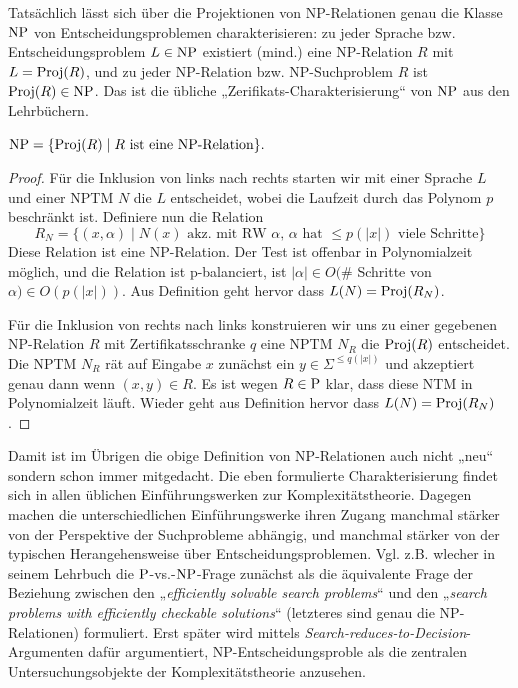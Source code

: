 Tatsächlich lässt sich über die Projektionen von NP-Relationen genau die Klasse $\NP$ von Entscheidungsproblemen charakterisieren: zu jeder Sprache bzw. Entscheidungsproblem $L\in \NP$ existiert (mind.) eine NP-Relation $R$ mit $L=\Proj(R)$, und zu jeder NP-Relation bzw. NP-Suchproblem $R$ ist $\Proj(R)\in\NP$. Das ist die übliche „Zerifikats-Charakterisierung“ von $\NP$ aus den Lehrbüchern.
\begin{observation}\label{obs:np-certificate-def}
    $\NP = \{ \Proj(R) \mid \text{$R$ ist eine NP-Relation} \}.$
\end{observation}
\begin{proof}
    Für die Inklusion von links nach rechts starten wir mit einer Sprache $L$ und einer NPTM $N$ die $L$ entscheidet, wobei die Laufzeit durch das Polynom $p$ beschränkt ist. Definiere nun die Relation
    \[ R_N = \{ (x, \alpha) \mid \text{$N(x)$ akz. mit RW $\alpha$, $\alpha$ hat $\leq p(|x|)$ viele Schritte} \} \]
    Diese Relation ist eine NP-Relation. Der Test ist offenbar in Polynomialzeit möglich, und die Relation ist p-balanciert, ist $|\alpha|\in O($\# Schritte von $\alpha)\in O(p(|x|))$.
    Aus Definition geht hervor dass $L(N) = \Proj(R_N)$.

    Für die Inklusion von rechts nach links konstruieren wir uns zu einer gegebenen NP-Relation $R$ mit Zertifikatsschranke $q$ eine NPTM $N_R$ die $\Proj(R)$ entscheidet. Die NPTM $N_R$ rät auf Eingabe $x$ zunächst ein $y\in\Sigma^{\leq q(|x|)}$ und akzeptiert genau dann wenn $(x,y)\in R$.
    Es ist wegen $R\in \P$ klar, dass diese NTM in Polynomialzeit läuft.
    Wieder geht aus Definition hervor dass $L(N) = \Proj(R_N)$.
\end{proof}
Damit ist im Übrigen die obige Definition von NP-Relationen auch nicht „neu“ sondern schon immer mitgedacht. Die eben formulierte Charakterisierung findet sich in allen üblichen Einführungswerken zur Komplexitätstheorie. Dagegen machen die unterschiedlichen Einführungswerke ihren Zugang manchmal stärker von der Perspektive der Suchprobleme abhängig, und manchmal stärker von der typischen Herangehensweise über Entscheidungsproblemen.
Vgl. z.B. \textcite{goldreich_computational_2008} wlecher in seinem Lehrbuch die $\P$-vs.-$\NP$-Frage zunächst als die äquivalente Frage der Beziehung zwischen den „\emph{efficiently solvable search problems}“ und den „\emph{search problems with efficiently checkable solutions}“ (letzteres sind genau die NP-Relationen) formuliert. Erst später wird mittels \emph{Search-reduces-to-Decision}-Argumenten dafür argumentiert, NP-Entscheidungsproble als die zentralen Untersuchungsobjekte der Komplexitätstheorie anzusehen.

